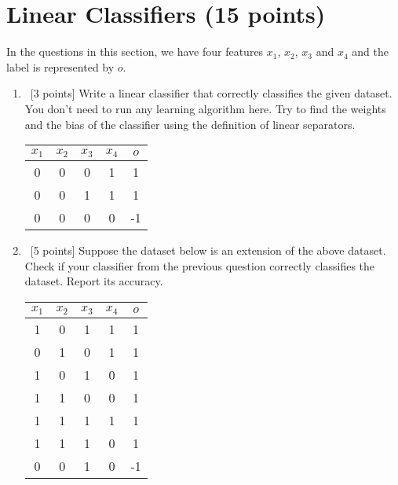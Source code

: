 \section{Linear Classifiers (15 points)}
\label{sec:q1}

In the questions in this section, we have four features $x_1$, $x_2$,
$x_3$ and $x_4$ and the label is represented by $o$.

\begin{enumerate}
\item ~[3 points] Write a linear classifier that correctly classifies the given dataset. You don't need to run any learning algorithm here. Try to find the weights and the bias of the classifier using the definition of linear separators.
  \begin{center}
    \begin{tabular}{cccc|c}
      $x_1$ & $x_2$ & $x_3$ & $x_4$ & $o$ \\ \hline
      0 & 0 & 0 & 1 & 1 \\
      0 & 0 & 1 & 1 & 1 \\
      0 & 0 & 0 & 0 & -1 \\
    \end{tabular}
  \end{center}

\item ~[5 points] Suppose the dataset below is an extension of the above dataset. Check if your classifier from the previous question correctly classifies the dataset. Report its accuracy.
  \begin{center}
    \begin{tabular}{cccc|c}
      $x_1$ & $x_2$ & $x_3$ & $x_4$ & $o$ \\ \hline
      1 & 0 & 1 & 1 & 1 \\
      0 & 1 & 0 & 1 & 1 \\
      1 & 0 & 1 & 0 & 1 \\
      1 & 1 & 0 & 0 & 1 \\
      1 & 1 & 1 & 1 & 1 \\
      1 & 1 & 1 & 0 & 1 \\
      0 & 0 & 1 & 0 & -1 \\
    \end{tabular}
  \end{center}


\end{enumerate}
